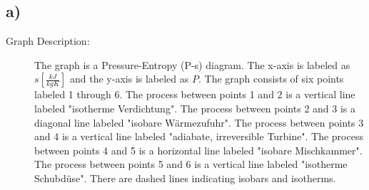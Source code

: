 

\subsection*{a)}

\begin{description}
    \item[Graph Description:] The graph is a Pressure-Entropy (P-s) diagram. The x-axis is labeled as $s \left[ \frac{kJ}{kgK} \right]$ and the y-axis is labeled as $P$. The graph consists of six points labeled 1 through 6. The process between points 1 and 2 is a vertical line labeled "isotherme Verdichtung". The process between points 2 and 3 is a diagonal line labeled "isobare Wärmezufuhr". The process between points 3 and 4 is a vertical line labeled "adiabate, irreversible Turbine". The process between points 4 and 5 is a horizontal line labeled "isobare Mischkammer". The process between points 5 and 6 is a vertical line labeled "isotherme Schubdüse". There are dashed lines indicating isobars and isotherms.
\end{description}